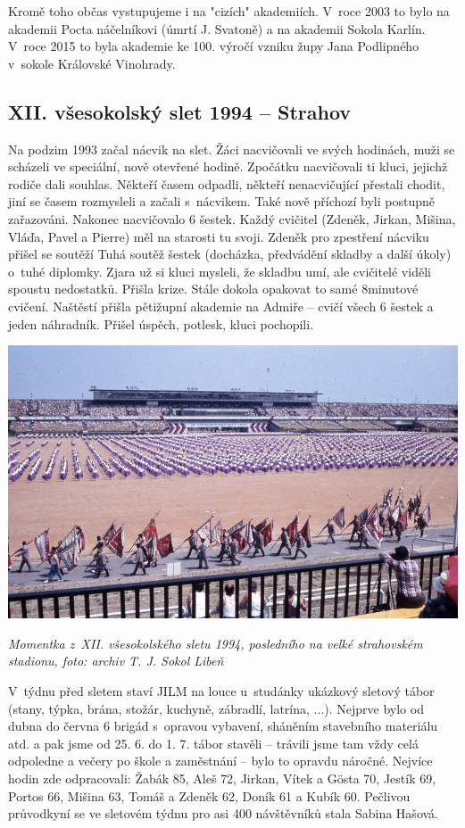 \documentclass[a5paper, 11pt, twoside]{article}
\begin{document}
Kromě toho občas vystupujeme i na "cizích" akademiích. V~roce 2003 to
bylo na akademii Pocta náčelníkovi (úmrtí J. Svatoně) a na akademii
Sokola Karlín. V~roce 2015 to byla akademie ke 100. výročí vzniku župy
Jana Podlipného v~sokole Královské Vinohrady.

\subsection{XII. všesokolský slet 1994 --
Strahov}

Na podzim 1993 začal nácvik na slet. Žáci nacvičovali ve svých hodinách,
muži se scházeli ve speciální, nově otevřené hodině. Zpočátku
nacvičovali ti kluci, jejichž rodiče dali souhlas. Někteří časem
odpadli, někteří nenacvičující přestali chodit, jiní se časem rozmysleli
a začali s~nácvikem. Také nově příchozí byli postupně zařazováni.
Nakonec nacvičovalo 6 šestek. Každý cvičitel (Zdeněk, Jirkan, Mišina,
Vláďa, Pavel a Pierre) měl na starosti tu svoji. Zdeněk pro zpestření
nácviku přišel se soutěží Tuhá soutěž šestek (docházka, předvádění
skladby a další úkoly) o~tuhé diplomky. Zjara už si kluci mysleli, že
skladbu umí, ale cvičitelé viděli spoustu nedostatků. Přišla krize.
Stále dokola opakovat to samé 8minutové cvičení. Naštěstí přišla
pětižupní akademie na Admiře -- cvičí všech 6 šestek a jeden náhradník.
Přišel úspěch, potlesk, kluci pochopili.

 \includegraphics[width=\textwidth]{img/44_slet_strahov.jpg}

\textit{Momentka z~XII. všesokolského sletu 1994, posledního na velké
strahovském stadionu, foto: archiv T. J. Sokol Libeň}

V~týdnu před sletem staví JILM na louce u~studánky ukázkový sletový
tábor (stany, týpka, brána, stožár, kuchyně, zábradlí, latrína, ...).
Nejprve bylo od dubna do června 6 brigád s~opravou vybavení, sháněním
stavebního materiálu atd. a pak jsme od 25. 6. do 1. 7. tábor stavěli --
trávili jsme tam vždy celá odpoledne a večery po škole a zaměstnání --
bylo to opravdu náročné. Nejvíce hodin zde odpracovali: Žabák 85, Aleš
72, Jirkan, Vítek a Gösta 70, Jestík 69, Portos 66, Mišina 63, Tomáš a
Zdeněk 62, Doník 61 a Kubík 60. Pečlivou průvodkyní se ve sletovém týdnu
pro asi 400 návštěvníků stala Sabina Hašová.
\end{document}
